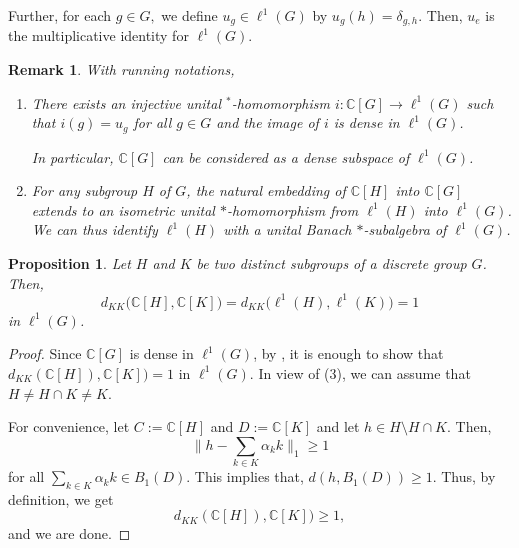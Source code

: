 \documentclass{amsart}
\numberwithin{equation}{section}
\newcommand{\ra}{\rightarrow}
\newcommand{\mbb}{\mathbb}
\newcommand{\C}{\mathbb C}
\newcommand{\1}{\mathbf{1}}
\newtheorem{proposition}[theorem]{Proposition}
\newtheorem{remark}[theorem]{Remark}
\begin{document}
Further, for each $g \in G,$ we define $u_{g}\in \ell^1(G)$ by
$u_{g}(h)=\delta_{g, h}$. Then, $u_e$ is the multiplicative identity
for $\ell^1(G)$. 
\begin{remark} With running notations,
  \begin{enumerate}
    \item
There exists an injective
unital $^*$-homomorphism $\mathit{i}: \C[G] \ra \ell^1(G)$ such that
$i(g) = u_g$ for all $g \in G$ and the image of $i$ is dense in $\ell^1(G)$.

In particular, $\C[G]$ can be considered as a dense subspace of $\ell^1(G)$.
\item For any subgroup $H$ of $G$, the natural embedding of  $\C[H]$ into $\C[G]$ extends  to an isometric
unital $*$-homomorphism from $\ell^1(H)$ into $\ell^1(G)$. We can thus
identify $\ell^1(H)$ with a unital Banach $*$-subalgebra of
$\ell^1(G)$.
\end{enumerate}
  \end{remark}
 
\begin{proposition}\label{distance-Banach-gp-algebras}
  Let $H$ and $K$ be two distinct subgroups of a discrete group $G$. Then,
  \begin{equation}
d_{KK}\big(\C[H], \C[K]\big)=    d_{KK}\Big(\ell^1(H), \ell^1(K)\Big)=1
  \end{equation}
  in $\ell^1(G)$.
\end{proposition}
\begin{proof}
Since $\mbb{C}[G]$ is dense in $\ell^1(G)$, by ,
it is enough to show that $d_{KK}(\mbb{C}[H]),\mbb{C}[K])=1$ in
$\ell^1(G)$. In view of (3), we can assume that
$H\neq H\cap K\neq K$.

For convenience, let $C:= \C[H]$ and $D := \C[K]$ and let $h\in H\setminus H\cap K$. Then,
\[
\|h- \sum_{k \in K} \alpha_k k\|_{1}\geq 1
\] 
for all $\sum_{k \in K} \alpha_k k \in
B_1(D)$.
This implies that, $d(h, B_1(D))\geq 1$. Thus, by definition, we get 
\[
d_{KK}(\mbb{C}[H]),\mbb{C}[K])\geq 1,
\]
and we are done.
  \end{proof}
\end{document}
